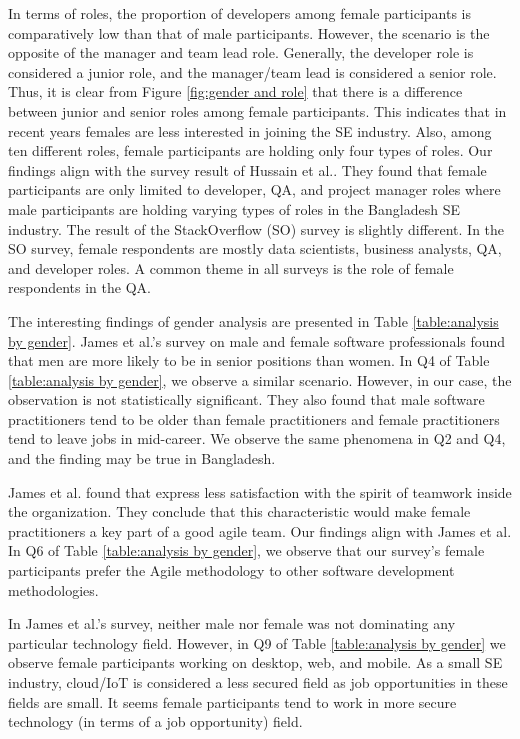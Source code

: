 In terms of roles, the proportion of developers among female participants is comparatively low than that of male participants. However, the scenario is the opposite of the manager and team lead role. Generally, the developer role is considered a junior role, and the manager/team lead is considered a senior role. Thus, it is clear from Figure \ref{fig:gender and role} that there is a difference between junior and senior roles among female participants. This indicates that in recent years females are less interested in joining the SE industry. Also, among ten different roles, female participants are holding only four types of roles.  Our findings align with the survey result of Hussain et al.\cite{Hussain2020}. They found that female participants are only limited to developer, QA, and project manager roles where male participants are holding varying types of roles in the Bangladesh SE industry. The result of the StackOverflow (SO) survey\cite{StackoverflowSurvey2020} is slightly different. In the SO survey, female respondents are mostly data scientists, business analysts, QA, and developer roles. A common theme in all surveys is the role of female respondents in the QA.



The interesting findings of gender analysis are presented in Table \ref{table:analysis by gender}. James et al.'s\cite{James2017} survey on male and female software professionals found that men are more likely to be in senior positions than women. In Q4 of Table \ref{table:analysis by gender}, we observe a similar scenario. However, in our case, the observation is not statistically significant. They also found that male software practitioners tend to be older than female practitioners and female practitioners tend to leave jobs in mid-career. We observe the same phenomena in Q2 and Q4, and the finding may be true in Bangladesh.


James et al.\cite{James2017} found that express less satisfaction with the spirit of teamwork inside the organization. They conclude that this characteristic would make female practitioners a key part of a good agile team. Our findings align with James et al\cite{James2017}. In Q6  of Table \ref{table:analysis by gender}, we observe that our survey's female participants prefer the Agile methodology to other software development methodologies. 

In James et al.'s survey, neither male nor female was not dominating any particular technology field. However, in Q9 of 
Table \ref{table:analysis by gender} we observe female participants working on desktop, web, and mobile. As a small SE industry, cloud/IoT is considered a less secured field as job opportunities in these fields are small. It seems female participants tend to work in more secure technology (in terms of a job opportunity) field.

